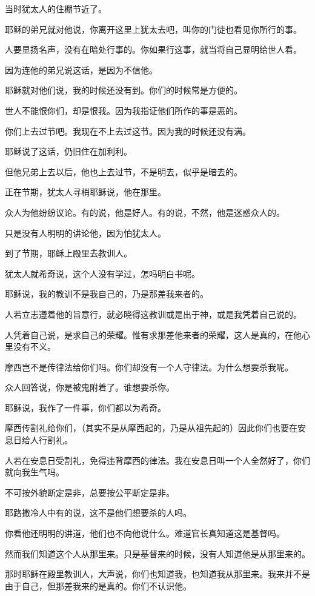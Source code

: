 \documentclass[12pt,oneside]{book}
\begin{document}
当时犹太人的住棚节近了。

耶稣的弟兄就对他说，你离开这里上犹太去吧，叫你的门徒也看见你所行的事。

人要显扬名声，没有在暗处行事的。你如果行这事，就当将自己显明给世人看。

因为连他的弟兄说这话，是因为不信他。

耶稣就对他们说，我的时候还没有到。你们的时候常是方便的。

世人不能恨你们，却是恨我。因为我指证他们所作的事是恶的。

你们上去过节吧。我现在不上去过这节。因为我的时候还没有满。

耶稣说了这话，仍旧住在加利利。

但他兄弟上去以后，他也上去过节，不是明去，似乎是暗去的。

正在节期，犹太人寻梢耶稣说，他在那里。

众人为他纷纷议论。有的说，他是好人。有的说，不然，他是迷惑众人的。

只是没有人明明的讲论他，因为怕犹太人。

到了节期，耶稣上殿里去教训人。

犹太人就希奇说，这个人没有学过，怎吗明白书呢。

耶稣说，我的教训不是我自己的，乃是那差我来者的。

人若立志遵着他的旨意行，就必晓得这教训或是出于神，或是我凭着自己说的。

人凭着自己说，是求自己的荣耀。惟有求那差他来者的荣耀，这人是真的，在他心里没有不义。

摩西岂不是传律法给你们吗。你们却没有一个人守律法。为什么想要杀我呢。

众人回答说，你是被鬼附着了。谁想要杀你。

耶稣说，我作了一件事，你们都以为希奇。

摩西传割礼给你们，（其实不是从摩西起的，乃是从祖先起的）因此你们也要在安息日给人行割礼。

人若在安息日受割礼，免得违背摩西的律法。我在安息日叫一个人全然好了，你们就向我生气吗。

不可按外貌断定是非，总要按公平断定是非。

耶路撒冷人中有的说，这不是他们想要杀的人吗。

你看他还明明的讲道，他们也不向他说什么。难道官长真知道这是基督吗。

然而我们知道这个人从那里来。只是基督来的时候，没有人知道他是从那里来的。

那时耶稣在殿里教训人，大声说，你们也知道我，也知道我从那里来。我来并不是由于自己，但那差我来的是真的。你们不认识他。
\end{document}
